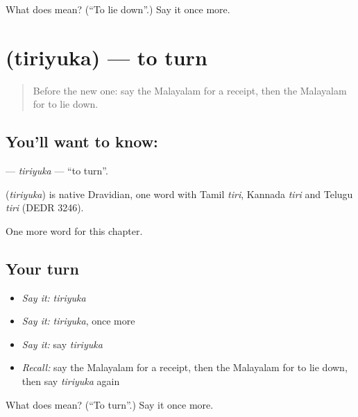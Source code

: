 \begin{tcolorbox}[breakable,colback=teal!4,colframe=teal!35!black,title={Before you move on}]
What does  mean? (\textquotedblleft{}To lie down\textquotedblright{}.) Say it once more.
\end{tcolorbox}
\section[\texorpdfstring{\ml{തിരിയുക} (tiriyuka)}{തിരിയുക (tiriyuka)}]{ (tiriyuka) — to turn}

\label{lesson:ML-C181-tiriyuka}



\begin{quote}
Before the new one: say the Malayalam for a receipt, then the Malayalam for to lie down.
\end{quote}

\subsection*{You'll want to know: }
\textbf{} — \emph{tiriyuka} — \textquotedblleft{}to turn\textquotedblright{}.

\begin{cousinweb}
\textbf{} (\emph{tiriyuka}) is native Dravidian, one word with Tamil \emph{tiri}, Kannada \emph{tiri} and Telugu \emph{tiri} (DEDR 3246).
\end{cousinweb}

\begin{grammarlens}[title={What you've built}]
One more word for this chapter.
\end{grammarlens}

\subsection*{Your turn}
\begin{itemize}
\raggedright
  \item \emph{Say it:} \emph{tiriyuka}
  \item \emph{Say it:} \emph{tiriyuka}, once more
  \item \emph{Say it:} say \emph{tiriyuka}
  \item \emph{Recall:} say the Malayalam for a receipt, then the Malayalam for to lie down, then say \emph{tiriyuka} again
\end{itemize}

\begin{tcolorbox}[breakable,colback=teal!4,colframe=teal!35!black,title={Before you move on}]
What does  mean? (\textquotedblleft{}To turn\textquotedblright{}.) Say it once more.
\end{tcolorbox}
